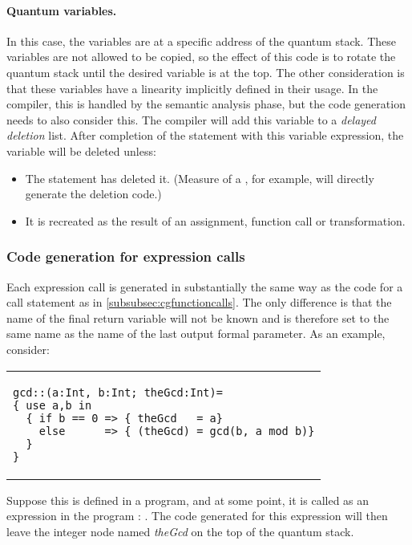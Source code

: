 \paragraph{Quantum variables.} In this case, the variables are at a
specific address of the quantum stack. These variables are not allowed
to be copied, so the effect of this code is to rotate the quantum stack 
until the desired variable is at the top. The other consideration
is that these variables have a linearity implicitly defined in their
usage. In the compiler, this is handled by the semantic analysis phase,
but the code generation needs to also consider this. The compiler will
add this variable to a \emph{delayed deletion} list. After completion
of the statement with this variable expression, the variable will be 
deleted unless:
\begin{itemize}
\item{} The statement has deleted it. (Measure of a \qubit, for example, will 
directly generate the deletion code.)
\item{} It is recreated as the result of an assignment, function call or
transformation.
\end{itemize}

\subsubsection{Code generation for expression calls}
Each expression call is generated in substantially the same way 
as the code for
a call statement as in \ref{subsubsec:cgfunctioncalls}. The only 
difference is that the name of the final return variable will not be known
and is therefore set to the same name as the name of the last output formal
parameter. As an example, consider:

\begin{center}
\begin{tabular}{p{4in}}
{\begin{singlespace}
\begin{lstlisting}[style=linqpl]
gcd::(a:Int, b:Int; theGcd:Int)= 
{ use a,b in 
  { if b == 0 => { theGcd   = a} 
    else      => { (theGcd) = gcd(b, a mod b)}
  }   
}
\end{lstlisting}
\end{singlespace}}
\end{tabular}
\end{center}


Suppose this is defined in a program, and at some point, it is called
as an expression in the program :
. The code generated for this expression will
then leave the integer node named \emph{theGcd} on the top
of the quantum stack.

